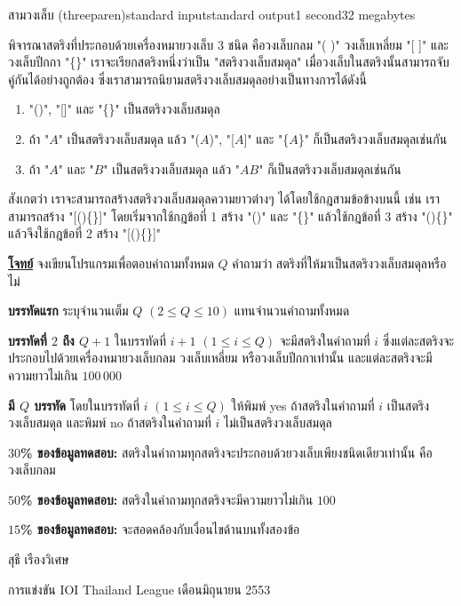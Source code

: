 \documentclass[11pt,a4paper]{article}
\begin{document}
\begin{problem}{สามวงเล็บ (threeparen)}{standard input}{standard output}{1 second}{32 megabytes}

พิจารณาสตริงที่ประกอบด้วยเครื่องหมายวงเล็บ $3$ ชนิด คือวงเล็บกลม "( )" วงเล็บเหลี่ยม "[ ]" และวงเล็บปีกกา "\{\}" เราจะเรียกสตริงหนึ่งว่าเป็น "สตริงวงเล็บสมดุล" เมื่อวงเล็บในสตริงนั้นสามารถจับคู่กันได้อย่างถูกต้อง ซึ่งเราสามารถนิยามสตริงวงเล็บสมดุลอย่างเป็นทางการได้ดังนี้

\begin{enumerate}
\item "()", "[]" และ "\{\}" เป็นสตริงวงเล็บสมดุล
\item ถ้า "$A$" เป็นสตริงวงเล็บสมดุล แล้ว "($A$)", "[$A$]" และ "\{$A$\}" ก็เป็นสตริงวงเล็บสมดุลเช่นกัน
\item ถ้า "$A$" และ "$B$" เป็นสตริงวงเล็บสมดุล แล้ว "$AB$" ก็เป็นสตริงวงเล็บสมดุลเช่นกัน
\end{enumerate}

สังเกตว่า เราจะสามารถสร้างสตริงวงเล็บสมดุลความยาวต่างๆ ได้โดยใช้กฎสามข้อข้างบนนี้ เช่น เราสามารถสร้าง "[()\{\}]" โดยเริ่มจากใช้กฎข้อที่ 1 สร้าง "()" และ "\{\}" แล้วใช้กฎข้อที่ 3 สร้าง "()\{\}" แล้วจึงใช้กฎข้อที่ 2 สร้าง "[()\{\}]"

\bigskip
\underline{\textbf{โจทย์}}  จงเขียนโปรแกรมเพื่อตอบคำถามทั้งหมด $Q$ คำถามว่า สตริงที่ให้มาเป็นสตริงวงเล็บสมดุลหรือไม่


\InputFile

\textbf{บรรทัดแรก} ระบุจำนวนเต็ม $Q$ $(2 \leq Q \leq 10)$ แทนจำนวนคำถามทั้งหมด

\textbf{บรรทัดที่ $2$ ถึง $Q+1$} ในบรรทัดที่ $i+1$ $(1 \leq i \leq Q)$ จะมีสตริงในคำถามที่ $i$ ซึ่งแต่ละสตริงจะประกอบไปด้วยเครื่องหมายวงเล็บกลม วงเล็บเหลี่ยม หรือวงเล็บปีกกาเท่านั้น และแต่ละสตริงจะมีความยาวไม่เกิน $100\,000$


\OutputFile

\textbf{มี $Q$ บรรทัด} โดยในบรรทัดที่ $i$ $(1 \leq i \leq Q)$ ให้พิมพ์ yes ถ้าสตริงในคำถามที่ $i$ เป็นสตริงวงเล็บสมดุล และพิมพ์ no ถ้าสตริงในคำถามที่ $i$ ไม่เป็นสตริงวงเล็บสมดุล

\Examples

\begin{example}
%
\exmp{3
(\{])[]
[(\{\}])
()[\{\}()]}{no
no
yes}%
\end{example}

\Scoring 

\textbf{$30$\% ของข้อมูลทดสอบ:} สตริงในคำถามทุกสตริงจะประกอบด้วยวงเล็บเพียงชนิดเดียวเท่านั้น คือวงเล็บกลม

\textbf{$50$\% ของข้อมูลทดสอบ:} สตริงในคำถามทุกสตริงจะมีความยาวไม่เกิน $100$

\textbf{$15$\% ของข้อมูลทดสอบ:} จะสอดคล้องกับเงื่อนไขด้านบนทั้งสองข้อ 

\Source

สุธี เรืองวิเศษ

การแข่งขัน IOI Thailand League เดือนมิถุนายน 2553


\end{problem}
\end{document}
